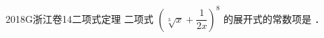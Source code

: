 
\begin{problem}{2018}{G}{浙江卷}{14}{二项式定理}
二项式 $ \left(\sqrt[3]{x}+\dfrac{1}{2x}\right)^8 $ 的展开式的常数项是 \underline{\hspace{4em}}．
\end{problem}

\begin{answer}

\end{answer}

\begin{solutions}

\end{solutions}
